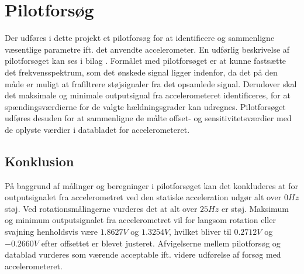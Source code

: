 \section{Pilotforsøg}
Der udføres i dette projekt et pilotforsøg for at identificere og sammenligne væsentlige parametre ift. det anvendte accelerometer. En udførlig beskrivelse af pilotforsøget kan ses i bilag .
Formålet med pilotforsøget er at kunne fastsætte det frekvensspektrum, som det ønskede signal ligger indenfor, da det på den måde er muligt at frafiltrere støjsignaler fra det opsamlede signal. Derudover skal det maksimale og minimale outputsignal fra accelerometeret identificeres, for at spændingsværdierne for de valgte hældningsgrader kan udregnes. Pilotforsøget udføres desuden for at sammenligne de målte offset- og sensitivitetsværdier med de oplyste værdier i databladet for accelerometeret. 
\subsection{Konklusion}
På baggrund af målinger og beregninger i pilotforsøget kan det konkluderes at for outputsignalet fra accelerometret ved den statiske acceleration udgør alt over $0Hz$ støj. Ved rotationsmålingerne vurderes det at alt over $25Hz$ er støj. Maksimum og minimum outputsignalet fra accelerometret vil for langsom rotation eller svajning henholdsvis være $1.8627V$ og $1.3254V$, hvilket bliver til $0.2712V$ og $-0.2660V$ efter offsettet er blevet justeret. Afvigelserne mellem pilotforsøg og datablad vurderes som værende acceptable ift. videre udførelse af forsøg med accelerometeret. 

